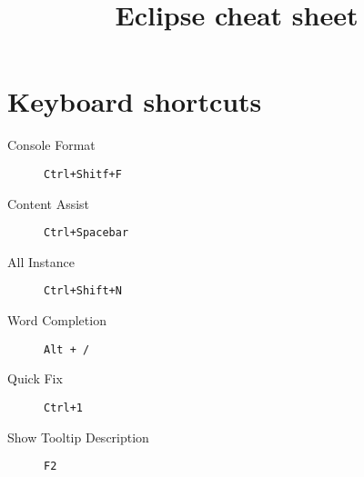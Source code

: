 \documentclass[11pt]{article}
\title{Eclipse cheat sheet}
\begin{document}
\section{Keyboard shortcuts}
\begin{description}
\item [Console Format] \verb|Ctrl+Shitf+F|
\item [Content Assist] \verb|Ctrl+Spacebar|
\item [All Instance] \verb|Ctrl+Shift+N|
\item [Word Completion] \verb|Alt + /|
\item [Quick Fix] \verb|Ctrl+1|
\item [Show Tooltip Description] \verb|F2|
\end{description}
\end{document}
